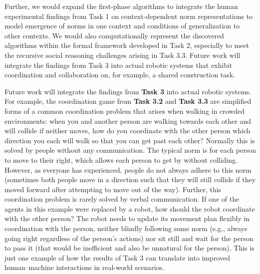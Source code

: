\documentclass[12pt]{article}
\begin{document}
Further, we would expand the first-phase algorithms to integrate the
human experimental findings from Task 1 on context-dependent norm
representations to model emergence of norms in one context and
conditions of generalization to other contexts.  We would also
computationally represent the discovered algorithms within the formal
framework developed in Task 2, especially to meet the recursive social
reasoning challenges arising in Task 3.3. Future work will integrate
the findings from Task 3 into actual robotic systems that exhibit
coordination and collaboration on, for example, a shared construction
task.

Future work will integrate the findings from {\bf Task 3} into actual
robotic systems.  
For example, the coordination game from {\bf Task 3.2} and {\bf Task
  3.3} are simplified forms of a common coordination problem that
arises when walking in crowded environments: when you and another
person are walking towards each other and will collide if neither
moves, how do you coordinate with the other person which direction you
each will walk so that you can get past each other? Normally this is
solved by people without any communication. The typical norm is for
each person to move to their right, which allows each person to get by
without colliding.  However, as everyone has experienced, people do not
always adhere to this norm (sometimes both people move in a direction
such that they will still collide if they moved forward after
attempting to move out of the way). Further, this coordination problem
is rarely solved by verbal communication. If one of the agents in this
example were replaced by a robot, how should the robot coordinate with
the other person? The robot needs to update its movement plan flexibly
in coordination with the person, neither blindly following some norm
(e.g., always going right regardless of the person's actions) nor sit
still and wait for the person to pass it (that would be inefficient
and also be unnatural for the person). This is just one example of how
the results of Task 3 can translate into improved human--machine
interactions in real-world scenarios.
\end{document}
